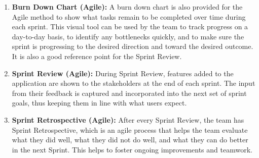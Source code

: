 \documentclass[oneside]{utmthesis}
\begin{document}
\begin{enumerate}[label= (\alph*)]
\begin{enumerate}[label= (\roman*)]
              \item \textit{Sprint 2 ~ User Module:} This sprint is dedicated to implementing user registration, login and profile management. It enables both students and lecturers to create and manage their accounts and learning preferences.

              \item \textit{Sprint 3 ~ Content Processing Module:} During this sprint, the functionality to upload local media and submit the link to the YouTube website is implemented. The content will be processed by the system and produce synchronized subtitles in Mandarin, pinyin, and English translation.

              \item \textit{Sprint 4 ~ Interactive Learning Module:} This sprint will deliver the interactive learing module, implementing features such as word search, bookmarking segenents, and reporting incorrect translations.

              \item \textit{Sprint 5 ~ Assessment Module:} This sprint will contain the fucntional testing and user acceptance testing. This will involve testing with users and stakeholders.

              \item \textit{Sprint 6 ~ Deployment Sprint:} This sprint will involve deploying the system to live servers and tesing the live deployment.
          \end{enumerate}

    \item \textbf{Burn Down Chart (Agile):} A burn down chart is also provided for the Agile method to show what tasks remain to be completed over time during each sprint. This visual tool can be used by the team to track progress on a day-to-day basis, to identify any bottlenecks quickly, and to make sure the sprint is progressing to the desired direction and toward the desired outcome. It is also a good reference point for the Sprint Review.

    \item \textbf{Sprint Review (Agile):} During Sprint Review, features added to the application are shown to the stakeholders at the end of each sprint. The input from their feedback is captured and incorporated into the next set of sprint goals, thus keeping them in line with what users expect.

    \item \textbf{Sprint Retrospective (Agile):} After every Sprint Review, the team has Sprint Retrospective, which is an agile process that helps the team evaluate what they did well, what they did not do well, and what they can do better in the next Sprint. This helps to foster ongoing improvements and teamwork.


\end{enumerate}
\end{document}
